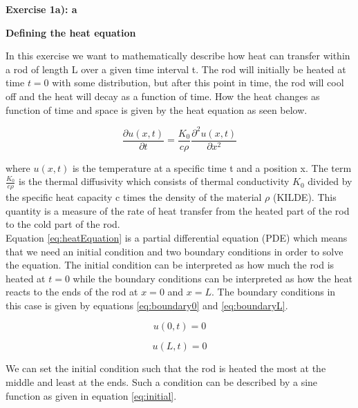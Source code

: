 \documentclass[12pt,a4paper]{article}
\begin{document}
\newpage

\begin{center}
\Large{\textbf{Exercise 1a): a}}
\end{center}

\begin{center}
\large{\textbf{Defining the heat equation}}
\end{center}

\noindent In this exercise we want to mathematically describe how heat can transfer within a rod of length L over a given time interval t. The rod will initially be heated at time $t = 0$ with some distribution, but after this point in time, the rod will cool off and the heat will decay as a function of time. How the heat changes as function of time and space is given by the heat equation as seen below.

\begin{equation}\label{eq:heatEquation}
\frac{\partial u(x,t)}{\partial t} = \frac{K_0}{c\rho} \frac{\partial^2 u(x,t)}{\partial x^2} 
\end{equation}

\noindent where $u(x,t)$ is the temperature at a specific time t and a position x. The term $\frac{K_0}{c\rho}$ is the thermal diffusivity which consists of thermal conductivity $K_0$ divided by the specific heat capacity c times the density of the material $\rho$ (KILDE). This quantity is a measure of the rate of heat transfer from the heated part of the rod to the cold part of the rod. 
\\
Equation \ref{eq:heatEquation} is a partial differential equation (PDE) which means that we need an initial condition and two boundary conditions in order to solve the equation. The initial condition can be interpreted as how much the rod is heated at $t = 0$ while the boundary conditions can be interpreted as how the heat reacts to the ends of the rod at $x = 0$ and $x = L$. The boundary conditions in this case is given by equations \ref{eq:boundary0} and \ref{eq:boundaryL}.

\begin{equation}\label{eq:boundary0}
u(0,t) = 0
\end{equation}

\begin{equation}\label{eq:boundaryL}
u(L,t) = 0
\end{equation}

\noindent We can set the initial condition such that the rod is heated the most at the middle and least at the ends. Such a condition can be described by a sine function as given in equation \ref{eq:initial}.
\end{document}
